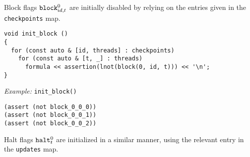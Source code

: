 \noindent
Block flags $\texttt{block}^0_{id, t}$ are initially disabled by relying on the entries given in the \texttt{checkpoints} map.

\newpage

\begin{lstlisting}[style=c++]
void init_block ()
{
  for (const auto & [id, threads] : checkpoints)
    for (const auto & [t, _] : threads)
      formula << assertion(lnot(block(0, id, t))) << '\n';
}
\end{lstlisting}

\noindent
\emph{Example:} \lstinline[style=c++]{init_block()}

\begin{lstlisting}[language=smtlib]
(assert (not block_0_0_0))
(assert (not block_0_0_1))
(assert (not block_0_0_2))
\end{lstlisting}


\noindent
Halt flags $\texttt{halt}^0_t$ are initialized in a similar manner, using the relevant entry in the \texttt{updates} map.

